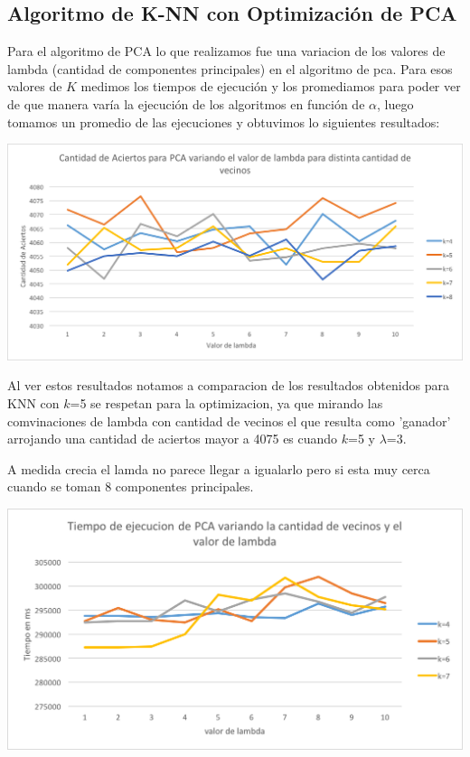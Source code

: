 \subsection {Algoritmo de K-NN con Optimización de PCA}
Para el algoritmo de PCA lo que realizamos fue una variacion de los valores de lambda (cantidad de componentes principales) en el algoritmo de pca. Para esos valores de $K$ medimos los tiempos de ejecución y los promediamos para poder ver de que manera varía la ejecución de los algoritmos en función de $\alpha$, luego tomamos un promedio de las ejecuciones y obtuvimos lo siguientes resultados:

\begin{center}
\includegraphics[scale=0.6]{imagenes/AciertosPCA.png}
\end{center}

Al ver estos resultados notamos a comparacion de los resultados obtenidos para KNN con $k$=5 se respetan para la optimizacion, ya que mirando las comvinaciones de lambda con cantidad de vecinos el que resulta como 'ganador' arrojando una cantidad de aciertos mayor a 4075 es cuando $k$=5 y $\lambda$=3. 

A medida crecia el lamda no parece llegar a igualarlo pero si esta muy cerca cuando se toman 8 componentes principales. 

\begin{center}
\includegraphics[scale=0.6]{imagenes/TiemposPCA.png}
\end{center}

